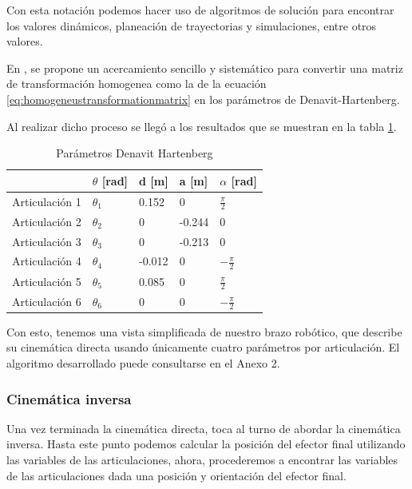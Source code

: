 Con esta notación podemos hacer uso de algoritmos de solución para encontrar los valores dinámicos, planeación de trayectorias y simulaciones, entre otros valores.

En \cite{Corke2007}, se propone un acercamiento sencillo y sistemático para convertir una matriz de transformación homogenea como la de la ecuación \ref{eq:homogeneustransformationmatrix} en los parámetros de Denavit-Hartenberg. 

Al realizar dicho proceso se llegó a los resultados que se muestran en la tabla \ref{table:denavithartenberg}.

\begin{table}
\centering
\caption{Parámetros Denavit Hartenberg}
 \label{table:denavithartenberg}
\begin{tabular}{l|l|l|l|l|}
               & $\theta$ [rad] & d [m]    & a [m]   & $\alpha$ [rad]                        \\ 
\hline
Articulación 1 & $\theta_1$              & 0.152    & 0       & $\frac{\pi}{2}$   \\
Articulación 2 & $\theta_2$              & 0        & -0.244       & 0 \\
Articulación 3 & $\theta_3$                  & 0 & -0.213       & 0                                                  \\
Articulación 4 & $\theta_4$              & -0.012        & 0 & $-\frac{\pi}{2}$   \\
Articulación 5 & $\theta_5$                        & 0.085        & 0 & $\frac{\pi}{2}$  \\
Articulación 6 & $\theta_6$                           & 0        & 0  & $-\frac{\pi}{2}$                                                 
\end{tabular}
\end{table}

Con esto, tenemos una vista simplificada de nuestro brazo robótico, que describe su cinemática directa usando únicamente cuatro parámetros por articulación. El algoritmo desarrollado puede consultarse en el Anexo 2.	

\subsubsection{Cinemática inversa}

Una vez terminada la cinemática directa, toca al turno de abordar la cinemática inversa. Hasta este punto podemos calcular la posición del efector final utilizando las variables de las articulaciones, ahora, procederemos a encontrar las variables de las articulaciones dada una posición y orientación del efector final.

